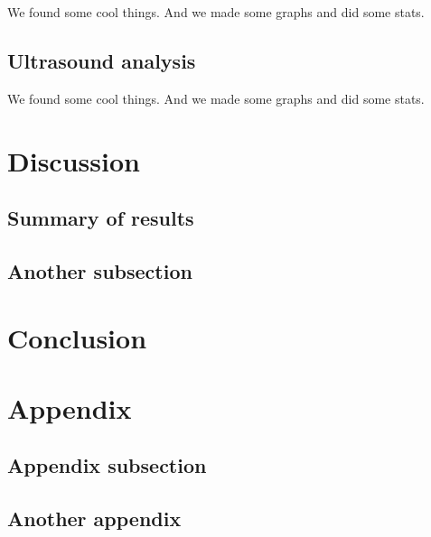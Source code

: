 \documentclass[letter, 12pt]{article} %
\begin{document}
We found some cool things. And we made some graphs and did some stats.


\subsection{Ultrasound analysis}

We found some cool things. And we made some graphs and did some stats.




\section{Discussion}

\subsection{Summary of results}


\subsection{Another subsection}




\section{Conclusion}




\clearpage
\appendix

\section{Appendix}

\subsection{Appendix subsection} \hspace{2cm}


\subsection{Another appendix} \hspace{2cm}


\clearpage

\endgroup %
\end{document}
